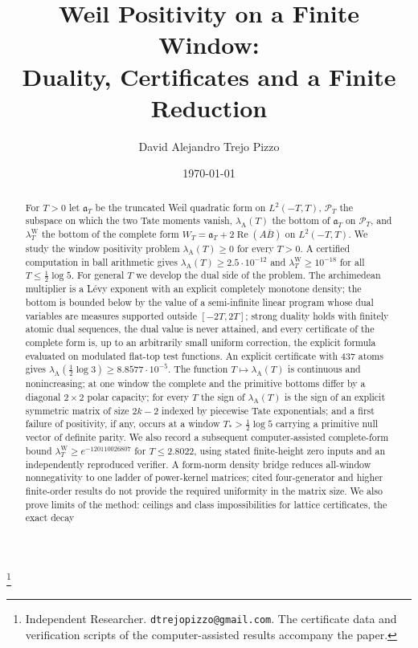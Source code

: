 \documentclass[11pt]{amsart}
\theoremstyle{definition}
\theoremstyle{remark}
\newcommand{\Rel}{\operatorname{Re}}
\newcommand{\PT}{\mathcal P_T}
\newcommand{\lamW}{\lambda^{\mathrm W}_T}
\newcommand{\lamA}{\lambda_{\mathrm A}(T)}
\begin{document}
\title[Weil positivity on a finite window]
{Weil Positivity on a Finite Window:\\
Duality, Certificates and a Finite Reduction}

\author{David Alejandro Trejo Pizzo}
\thanks{Independent Researcher. \texttt{dtrejopizzo@gmail.com}. The certificate data and verification
scripts of the computer-assisted results accompany the paper.}

\date{\today}

\begin{abstract}
For $T>0$ let $\mathfrak a_T$ be the truncated Weil quadratic form on $L^2(-T,T)$, $\PT$ the
subspace on which the two Tate moments vanish, $\lamA$ the bottom of $\mathfrak a_T$ on $\PT$, and
$\lamW$ the bottom of the complete form $W_T=\mathfrak a_T+2\Rel(A\bar B)$ on $L^2(-T,T)$. We study
the window positivity problem $\lamA\ge0$ for every $T>0$. A certified computation in ball
arithmetic gives $\lamA\ge2.5\cdot10^{-12}$ and $\lamW\ge10^{-18}$ for all $T\le\frac12\log5$. For
general $T$ we develop the dual side of the problem. The archimedean multiplier is a L\'evy exponent
with an explicit completely monotone density; the bottom is bounded below by the value of a
semi-infinite linear program whose dual variables are measures supported outside $[-2T,2T]$; strong
duality holds with finitely atomic dual sequences, the dual value is never attained, and every
certificate of the complete form is, up to an arbitrarily small uniform correction, the explicit formula
evaluated on modulated flat-top test functions. An explicit certificate with $437$ atoms gives
$\lambda_{\mathrm A}(\frac12\log3)\ge8.8577\cdot10^{-5}$. The function $T\mapsto\lamA$ is continuous and
nonincreasing; at one window the complete and the primitive bottoms differ by a diagonal $2\times2$
polar capacity; for every $T$ the sign of $\lamA$ is the sign of an explicit symmetric matrix of size
$2k-2$ indexed by piecewise Tate exponentials; and a first failure of positivity, if any, occurs at a
window $T_*>\frac12\log5$ carrying a primitive null vector of definite parity. We also record a subsequent
computer-assisted complete-form bound $\lamW\ge e^{-120110026807}$ for $T\le2.8022$, using stated
finite-height zero inputs and an independently reproduced verifier. A form-norm density bridge reduces
all-window nonnegativity to one ladder of power-kernel matrices; cited four-generator and higher finite-order
results do not provide the required uniformity in the matrix size. We also prove limits of
the method: ceilings and class impossibilities for lattice certificates, the exact decay

\end{abstract}
\end{document}
